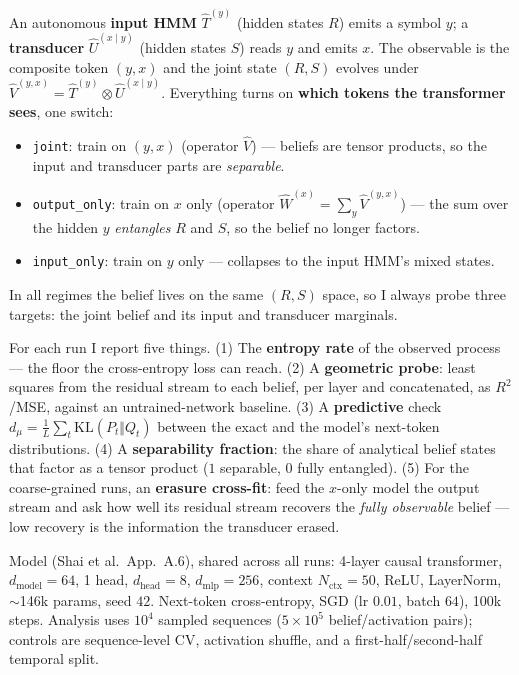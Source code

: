 \documentclass[11pt]{article}
\begin{document}
An autonomous \textbf{input HMM} $\hat T^{(y)}$ (hidden states $R$) emits a symbol $y$; a
\textbf{transducer} $\hat U^{(x\mid y)}$ (hidden states $S$) reads $y$ and emits $x$. The observable
is the composite token $(y,x)$ and the joint state $(R,S)$ evolves under
$\hat V^{(y,x)} = \hat T^{(y)} \otimes \hat U^{(x\mid y)}$. Everything turns on \textbf{which tokens
the transformer sees}, one switch:
\begin{itemize}\itemsep1pt
  \item \texttt{joint}: train on $(y,x)$ (operator $\hat V$) --- beliefs are tensor products, so the
        input and transducer parts are \emph{separable}.
  \item \texttt{output\_only}: train on $x$ only (operator $\hat W^{(x)}=\sum_y\hat V^{(y,x)}$) ---
        the sum over the hidden $y$ \emph{entangles} $R$ and $S$, so the belief no longer factors.
  \item \texttt{input\_only}: train on $y$ only --- collapses to the input HMM's mixed states.
\end{itemize}
In all regimes the belief lives on the same $(R,S)$ space, so I always probe three targets: the
joint belief and its input and transducer marginals.

For each run I report five things. (1) The \textbf{entropy rate} of the observed process --- the
floor the cross-entropy loss can reach. (2) A \textbf{geometric probe}: least squares from the
residual stream to each belief, per layer and concatenated, as $R^2$/MSE, against an
untrained-network baseline. (3) A \textbf{predictive} check $d_\mu=\frac1L\sum_t
\mathrm{KL}(P_t\Vert Q_t)$ between the exact and the model's next-token distributions. (4) A
\textbf{separability fraction}: the share of analytical belief states that factor as a tensor
product ($1$ separable, $0$ fully entangled). (5) For the coarse-grained runs, an \textbf{erasure
cross-fit}: feed the $x$-only model the output stream and ask how well its residual stream recovers
the \emph{fully observable} belief --- low recovery is the information the transducer erased.

Model (Shai et al.\ App.\ A.6), shared across all runs: 4-layer causal transformer,
$d_{\text{model}}{=}64$, 1 head, $d_{\text{head}}{=}8$, $d_{\text{mlp}}{=}256$, context
$N_{\text{ctx}}{=}50$, ReLU, LayerNorm, $\sim$146k params, seed $42$. Next-token cross-entropy, SGD
(lr $0.01$, batch $64$), 100k steps. Analysis uses $10^4$ sampled sequences ($5\times10^5$
belief/activation pairs); controls are sequence-level CV, activation shuffle, and a
first-half/second-half temporal split.
\end{document}
